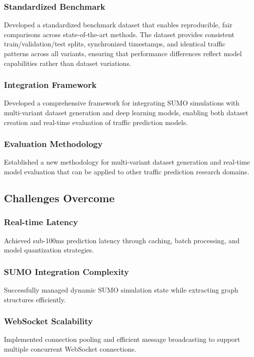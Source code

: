 \subsubsection{Standardized Benchmark}
Developed a standardized benchmark dataset that enables reproducible, fair comparisons across state-of-the-art methods. The dataset provides consistent train/validation/test splits, synchronized timestamps, and identical traffic patterns across all variants, ensuring that performance differences reflect model capabilities rather than dataset variations.

\subsubsection{Integration Framework}
Developed a comprehensive framework for integrating SUMO simulations with multi-variant dataset generation and deep learning models, enabling both dataset creation and real-time evaluation of traffic prediction models.

\subsubsection{Evaluation Methodology}
Established a new methodology for multi-variant dataset generation and real-time model evaluation that can be applied to other traffic prediction research domains.

\subsection{Challenges Overcome}

\subsubsection{Real-time Latency}
Achieved sub-100ms prediction latency through caching, batch processing, and model quantization strategies.

\subsubsection{SUMO Integration Complexity}
Successfully managed dynamic SUMO simulation state while extracting graph structures efficiently.

\subsubsection{WebSocket Scalability}
Implemented connection pooling and efficient message broadcasting to support multiple concurrent WebSocket connections.

